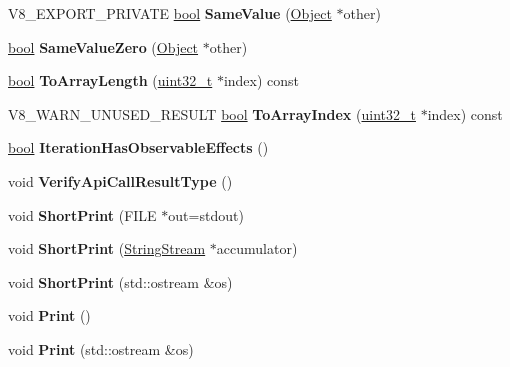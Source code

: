 \begin{DoxyCompactItemize}
V8\+\_\+\+E\+X\+P\+O\+R\+T\+\_\+\+P\+R\+I\+V\+A\+TE \mbox{\hyperlink{classbool}{bool}} {\bfseries Same\+Value} (\mbox{\hyperlink{classv8_1_1internal_1_1Object}{Object}} $\ast$other)
\item 
\mbox{\label{classv8_1_1internal_1_1Object_a4d8b23dea1291a4c315deb06bf17b495}} 
\mbox{\hyperlink{classbool}{bool}} {\bfseries Same\+Value\+Zero} (\mbox{\hyperlink{classv8_1_1internal_1_1Object}{Object}} $\ast$other)
\item 
\mbox{\label{classv8_1_1internal_1_1Object_a78c84e3c55128fe5df312c1ab602a7b9}} 
\mbox{\hyperlink{classbool}{bool}} {\bfseries To\+Array\+Length} (\mbox{\hyperlink{classuint32__t}{uint32\+\_\+t}} $\ast$index) const
\item 
\mbox{\label{classv8_1_1internal_1_1Object_a846912960a786073eeedd77d4e6fdbda}} 
V8\+\_\+\+W\+A\+R\+N\+\_\+\+U\+N\+U\+S\+E\+D\+\_\+\+R\+E\+S\+U\+LT \mbox{\hyperlink{classbool}{bool}} {\bfseries To\+Array\+Index} (\mbox{\hyperlink{classuint32__t}{uint32\+\_\+t}} $\ast$index) const
\item 
\mbox{\label{classv8_1_1internal_1_1Object_a016d3df83eee1f161a1e28114068cabf}} 
\mbox{\hyperlink{classbool}{bool}} {\bfseries Iteration\+Has\+Observable\+Effects} ()
\item 
\mbox{\label{classv8_1_1internal_1_1Object_a747f38950d5bc130fe841793d9296233}} 
void {\bfseries Verify\+Api\+Call\+Result\+Type} ()
\item 
\mbox{\label{classv8_1_1internal_1_1Object_a606e3708ccfa1723658f9dcf85d3f120}} 
void {\bfseries Short\+Print} (F\+I\+LE $\ast$out=stdout)
\item 
\mbox{\label{classv8_1_1internal_1_1Object_ab2fafb6a18ed0bd9d8a5f7304d171f79}} 
void {\bfseries Short\+Print} (\mbox{\hyperlink{classv8_1_1internal_1_1StringStream}{String\+Stream}} $\ast$accumulator)
\item 
\mbox{\label{classv8_1_1internal_1_1Object_a5746a2222a55023ed9e71f098ff104e3}} 
void {\bfseries Short\+Print} (std\+::ostream \&os)
\item 
\mbox{\label{classv8_1_1internal_1_1Object_aba72f1001be0f3a5c82840240ddfa7fe}} 
void {\bfseries Print} ()
\item 
\mbox{\label{classv8_1_1internal_1_1Object_a072cf57c6200702c1683e2c75a7b78c3}} 
void {\bfseries Print} (std\+::ostream \&os)
\end{DoxyCompactItemize}
